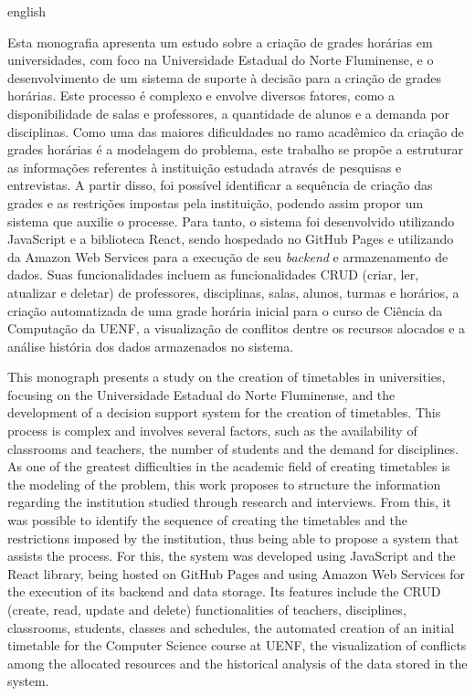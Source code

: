 \begin{resumo}[Abstract]
  \begin{otherlanguage*}{english}

    Esta monografia apresenta um estudo sobre a criação de grades horárias em universidades, com foco na Universidade Estadual do Norte Fluminense, e o desenvolvimento de um sistema de suporte à decisão para a criação de grades horárias. Este processo é complexo e envolve diversos fatores, como a disponibilidade de salas e professores, a quantidade de alunos e a demanda por disciplinas. Como uma das maiores dificuldades no ramo acadêmico da criação de grades horárias é a modelagem do problema, este trabalho se propõe a estruturar as informações referentes à instituição estudada através de pesquisas e entrevistas. A partir disso, foi possível identificar a sequência de criação das grades e as restrições impostas pela instituição, podendo assim propor um sistema que auxilie o processe. Para tanto, o sistema foi desenvolvido utilizando JavaScript e a biblioteca React, sendo hospedado no GitHub Pages e utilizando da Amazon Web Services para a execução de seu \textit{backend} e armazenamento de dados. Suas funcionalidades incluem as funcionalidades CRUD (criar, ler, atualizar e deletar) de professores, disciplinas, salas, alunos, turmas e horários, a criação automatizada de uma grade horária inicial para o curso de Ciência da Computação da UENF, a visualização de conflitos dentre os recursos alocados e a análise história dos dados armazenados no sistema.

    This monograph presents a study on the creation of timetables in universities, focusing on the Universidade Estadual do Norte Fluminense, and the development of a decision support system for the creation of timetables. This process is complex and involves several factors, such as the availability of classrooms and teachers, the number of students and the demand for disciplines. As one of the greatest difficulties in the academic field of creating timetables is the modeling of the problem, this work proposes to structure the information regarding the institution studied through research and interviews. From this, it was possible to identify the sequence of creating the timetables and the restrictions imposed by the institution, thus being able to propose a system that assists the process. For this, the system was developed using JavaScript and the React library, being hosted on GitHub Pages and using Amazon Web Services for the execution of its backend and data storage. Its features include the CRUD (create, read, update and delete) functionalities of teachers, disciplines, classrooms, students, classes and schedules, the automated creation of an initial timetable for the Computer Science course at UENF, the visualization of conflicts among the allocated resources and the historical analysis of the data stored in the system.


\end{otherlanguage*}
\end{resumo}
